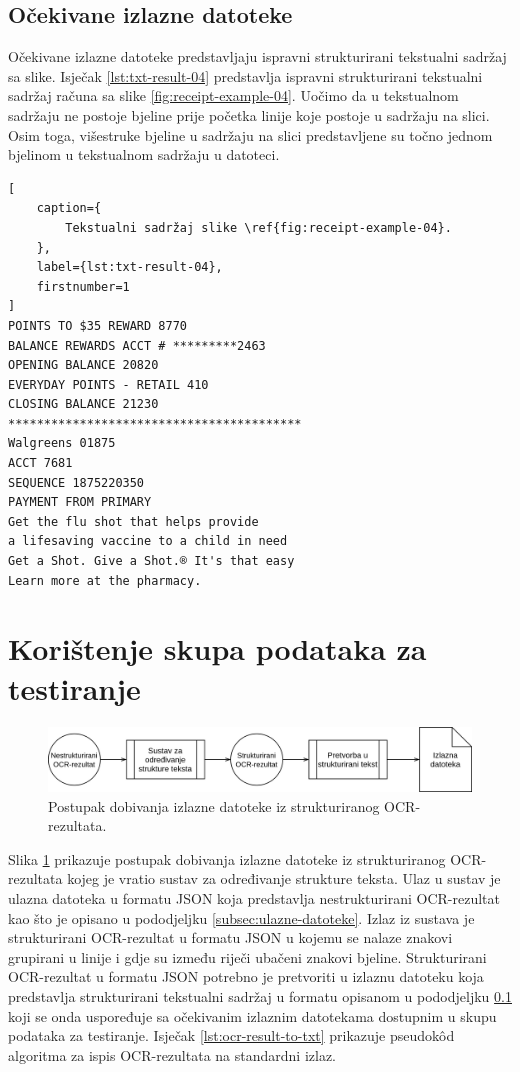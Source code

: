 \documentclass[times, utf8, zavrsni]{fer}
\begin{document}
\subsection{Očekivane izlazne datoteke}
\label{subsec:očekivane-izlazne-datoteke}
Očekivane izlazne datoteke predstavljaju ispravni strukturirani tekstualni
sadržaj sa slike. Isječak \ref{lst:txt-result-04} predstavlja ispravni
strukturirani tekstualni sadržaj računa sa slike \ref{fig:receipt-example-04}.
Uočimo da u tekstualnom sadržaju ne postoje bjeline prije početka linije koje
postoje u sadržaju na slici. Osim toga, višestruke bjeline u sadržaju na slici
predstavljene su točno jednom bjelinom u tekstualnom sadržaju u datoteci.

\begin{lstlisting}[
    caption={
        Tekstualni sadržaj slike \ref{fig:receipt-example-04}.
    },
    label={lst:txt-result-04},
    firstnumber=1
]
POINTS TO $35 REWARD 8770
BALANCE REWARDS ACCT # *********2463
OPENING BALANCE 20820
EVERYDAY POINTS - RETAIL 410
CLOSING BALANCE 21230
*****************************************
Walgreens 01875
ACCT 7681
SEQUENCE 1875220350
PAYMENT FROM PRIMARY
Get the flu shot that helps provide
a lifesaving vaccine to a child in need
Get a Shot. Give a Shot.® It's that easy
Learn more at the pharmacy.
\end{lstlisting}








\section{Korištenje skupa podataka za testiranje}
\begin{figure}[htb]
    \centering
    \captionsetup{justification=centering,margin=2cm}
    \includegraphics[width=\textwidth]{images/sustav-02.png}
    \caption{
        Postupak dobivanja izlazne datoteke iz strukturiranog OCR-rezultata.
    }
    \label{fig:sustav-02}
\end{figure}
Slika \ref{fig:sustav-02} prikazuje postupak dobivanja izlazne datoteke iz
strukturiranog OCR-rezultata kojeg je vratio sustav za određivanje strukture
teksta. Ulaz u sustav je ulazna datoteka u formatu JSON koja predstavlja
nestrukturirani OCR-rezultat kao što je opisano u pododjeljku
\ref{subsec:ulazne-datoteke}.
Izlaz iz sustava je strukturirani OCR-rezultat u formatu JSON u kojemu se nalaze
znakovi grupirani u linije i gdje su između riječi ubačeni znakovi bjeline.
Strukturirani OCR-rezultat u formatu JSON potrebno je pretvoriti u izlaznu
datoteku koja predstavlja strukturirani tekstualni sadržaj u formatu opisanom u
pododjeljku \ref{subsec:očekivane-izlazne-datoteke} koji se onda
uspoređuje sa očekivanim izlaznim datotekama dostupnim u skupu podataka za
testiranje. Isječak \ref{lst:ocr-result-to-txt} prikazuje pseudokôd algoritma
za ispis OCR-rezultata na standardni izlaz.
\end{document}
